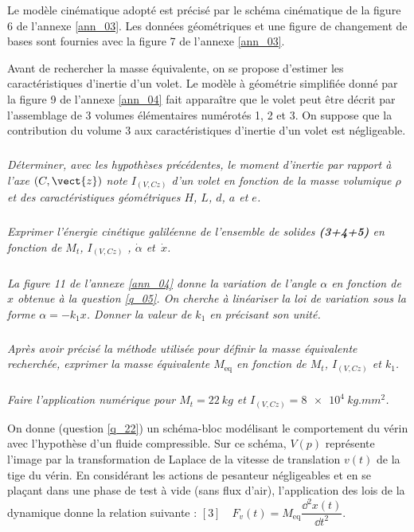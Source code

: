 \documentclass[10pt,fleqn]{article} %
\begin{document}
Le modèle cinématique adopté est précisé par le schéma cinématique de la figure 6 de l'annexe \ref{ann_03}. Les données géométriques et une figure de changement de bases sont fournies avec la figure 7 de l'annexe \ref{ann_03}.

Avant de rechercher la masse équivalente, on se propose d'estimer les caractéristiques d'inertie d'un volet. Le modèle à géométrie simplifiée donné par la  figure 9 de l'annexe \ref{ann_04} fait apparaître que le volet peut être décrit par l'assemblage de 3 volumes élémentaires numérotés 1, 2 et 3. On suppose que la contribution du volume 3 aux caractéristiques d'inertie d'un volet est négligeable.


\subparagraph{}\textit{Déterminer, avec les hypothèses précédentes, le moment d'inertie par rapport à l'axe $\left(C,\vect{z}\right)$ note $I_{\left(V,Cz\right)}$ d'un volet en fonction de la masse volumique $\rho$ et des caractéristiques géométriques $H$, $L$, $d$, $a$ et $e$.}

\subparagraph{}\textit{Exprimer l'énergie cinétique galiléenne de l'ensemble de solides \textbf{(3+4+5)} en fonction de $M_t$, $I_{\left(V,Cz\right)}$ , $\dot{\alpha}$  et~$\dot{x}$.}

\subparagraph{}\textit{La  figure 11 de l'annexe \ref{ann_04} donne la variation de l'angle $\alpha$ en fonction de $x$ obtenue à la question \ref{q_05}. On cherche à linéariser la loi de variation sous la forme $\alpha=-k_1 x$. Donner la valeur de $k_1$ en précisant son unité.}

\subparagraph{}\textit{Après avoir précisé la méthode utilisée pour définir la masse équivalente recherchée, exprimer la masse équivalente $M_{\text{eq}}$ en fonction de $M_t$,  $I_{\left(V,Cz\right)}$ et $k_1$. }

\subparagraph{}\textit{Faire l'application numérique pour $M_t=\SI{22}{kg}$ et $I_{\left(V,Cz\right)}=\SI{8e4}{kg.mm^2}$. }

On donne (question \ref{q_22}) un schéma-bloc modélisant le comportement du vérin avec l'hypothèse d'un fluide compressible. Sur ce schéma, $V(p)$ représente l'image par la transformation de Laplace de la vitesse de translation $v(t)$ de la tige du vérin. 
En considérant les actions de pesanteur négligeables et en se plaçant dans une phase de test à vide (sans flux d'air), l'application des lois de la dynamique donne la relation suivante : $[3] \quad  F_v(t)=M_{\text{eq}}\dfrac{\dd^2 x(t)}{\dd t^2}$.
  	 	 
\end{document}
